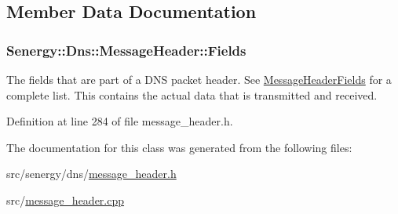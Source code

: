 \subsection{Member Data Documentation}
\hypertarget{class_senergy_1_1_dns_1_1_message_header_a014c173ce2b2c5bb06ae9e5d0e201159}{
\subsubsection[{Fields}]{ Senergy\-::\-Dns\-::\-Message\-Header\-::\-Fields}}\label{class_senergy_1_1_dns_1_1_message_header_a014c173ce2b2c5bb06ae9e5d0e201159}


The fields that are part of a D\-N\-S packet header. See \hyperlink{struct_senergy_1_1_dns_1_1_message_header_fields}{Message\-Header\-Fields} for a complete list. This contains the actual data that is transmitted and received. 



Definition at line 284 of file message\-\_\-header.\-h.



The documentation for this class was generated from the following files\-:\begin{DoxyCompactItemize}
\item 
src/senergy/dns/\hyperlink{message__header_8h}{message\-\_\-header.\-h}\item 
src/\hyperlink{message__header_8cpp}{message\-\_\-header.\-cpp}\end{DoxyCompactItemize}
